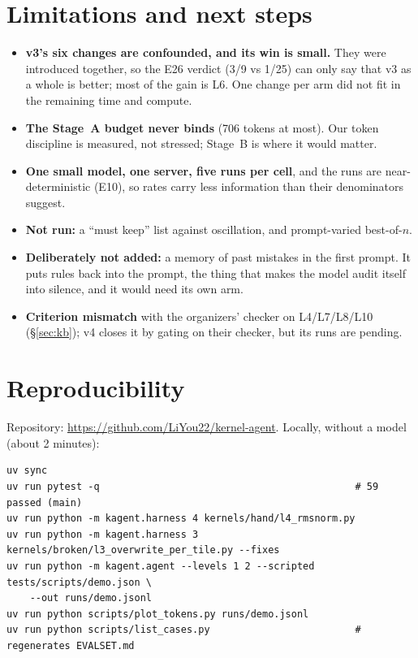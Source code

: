 \documentclass[11pt]{article}
\newcommand{\E}[1]{E#1}
\begin{document}
\section{Limitations and next steps}
\label{sec:limits}
\begin{itemize}
  \item \textbf{v3's six changes are confounded, and its win is small.} They were introduced together, so
        the E26 verdict (3/9 vs 1/25) can only say that v3 as a whole is better; most of the gain is L6. One change per arm did not fit in the remaining time
        and compute.
  \item \textbf{The Stage~A budget never binds} (706 tokens at most). Our token discipline is measured,
        not stressed; Stage~B is where it would matter.
  \item \textbf{One small model, one server, five runs per cell}, and the runs are near-deterministic
        (\E{10}), so rates carry less information than their denominators suggest.
  \item \textbf{Not run:} a ``must keep'' list against oscillation, and prompt-varied best-of-$n$.
  \item \textbf{Deliberately not added:} a memory of past mistakes in the first prompt. It puts rules
        back into the prompt, the thing that makes the model audit itself into silence, and it would need
        its own arm.
  \item \textbf{Criterion mismatch} with the organizers' checker on L4/L7/L8/L10 (\S\ref{sec:kb}); v4 closes it
        by gating on their checker, but its runs are pending.
\end{itemize}

\section{Reproducibility}
Repository: \url{https://github.com/LiYou22/kernel-agent}. Locally, without a model (about 2 minutes):

\begin{small}
\begin{verbatim}
uv sync
uv run pytest -q                                            # 59 passed (main)
uv run python -m kagent.harness 4 kernels/hand/l4_rmsnorm.py
uv run python -m kagent.harness 3 kernels/broken/l3_overwrite_per_tile.py --fixes
uv run python -m kagent.agent --levels 1 2 --scripted tests/scripts/demo.json \
    --out runs/demo.jsonl
uv run python scripts/plot_tokens.py runs/demo.jsonl
uv run python scripts/list_cases.py                         # regenerates EVALSET.md
\end{verbatim}
\end{small}
\end{document}
